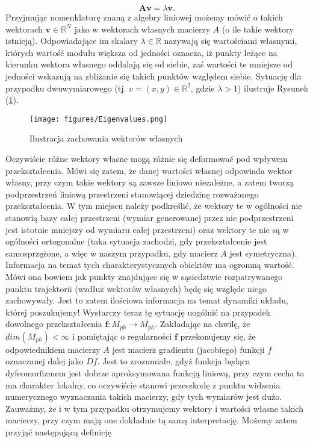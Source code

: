 \documentclass[12pt, twoside]{book}
\begin{document}
\begin{equation}
	\textbf{A}\textbf{v} = \lambda \textbf{v}.
\end{equation}
Przyjmując nomenklaturę znaną z algebry liniowej możemy mówić o takich wektorach $ \textbf{v} \in \mathbb{R}^{N} $ jako w wektorach własnych macierzy $ A $ (o ile takie wektory istnieją). Odpowiadające im skalary $ \lambda \in \mathbb{R} $ nazywają się wartościami własnymi, których wartość modułu większa od jedności oznacza, iż punkty leżące na kierunku wektora własnego oddalają się od siebie, zaś wartości te mniejsze od jedności wskazują na zbliżanie się takich punktów względem siebie. Sytuację dla przypadku dwuwymiarowego (tj. $ v = (x,y) \in \mathbb{R}^2 $, gdzie $ \lambda > 1 $) ilustruje Rysunek (\ref{Fig13}).
\begin{figure}[H]
	\texttt{[image: figures/Eigenvalues.png]} 
	\centering
	\caption{Ilustracja zachowania wektorów własnych}
	\label{Fig13}
\end{figure}
Oczywiście różne wektory własne mogą różnie się deformować pod wpływem przekształcenia. Mówi się zatem, że danej wartości własnej odpowiada wektor własny, przy czym takie wektory są zawsze liniowo niezależne, a zatem tworzą podprzestrzeń liniową przestrzeni stanowiącej dziedzinę rozważanego przekształcenia. W tym miejscu należy podkreślić, że wektory te w ogólności nie stanowią bazy całej przestrzeni (wymiar generowanej przez nie podprzestrzeni jest istotnie mniejszy od wymiaru całej przestrzeni) oraz wektory te nie są w   ogólności ortogonalne (taka sytuacja zachodzi, gdy przekształcenie jest samosprzężone, a więc w naszym przypadku, gdy macierz $ A $ jest symetryczna). \newline
Informacja na temat tych charakterystycznych obiektów ma ogromną wartość. Mówi ona bowiem jak punkty znajdujące się w sąsiedztwie rozpatrywanego punktu trajektorii (wzdłuż wektorów własnych) będę się względe niego zachowywały. Jest to zatem ilościowa informacja na temat dynamiki układu, której poszukujemy! Wystarczy teraz tę sytuację uogólnić na przypadek dowolnego przekształcenia $ \textbf{f}: M_{ph} \rightarrow M_{ph}$. Zakładając na chwilę, że $ dim(M_{ph}) < \infty $ i pamiętając o regularności $ \textbf{f} $ przekonujemy się, że odpowiednikiem macierzy $ A $ jest macierz gradientu (jacobiego) funkcji $ f $ oznaczanej dalej jako $ Df $. Jest to zrozumiałe, gdyż funkcja będąca dyfeomorfizmem jest dobrze aproksymowana funkcją liniową, przy czym cecha ta ma charakter lokalny, co oczywiście stanowi przeszkodę z punktu widzenia numerycznego wyznaczania takich macierzy, gdy tych wymiarów jest dużo. Zauważmy, że i w tym przypadku otrzymujemy wektory i wartości własne takich macierzy, przy czym mają one dokładnie tą samą interpretację. Możemy zatem przyjąć następującą definicję
\end{document}
